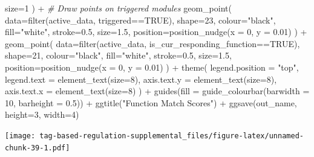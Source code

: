 \documentclass[
]{book}
\newenvironment{Shaded}{\begin{snugshade}}{\end{snugshade}}
\newcommand{\AttributeTok}[1]{\textcolor[rgb]{0.77,0.63,0.00}{#1}}
\newcommand{\CommentTok}[1]{\textcolor[rgb]{0.56,0.35,0.01}{\textit{#1}}}
\newcommand{\ConstantTok}[1]{\textcolor[rgb]{0.00,0.00,0.00}{#1}}
\newcommand{\DecValTok}[1]{\textcolor[rgb]{0.00,0.00,0.81}{#1}}
\newcommand{\FloatTok}[1]{\textcolor[rgb]{0.00,0.00,0.81}{#1}}
\newcommand{\FunctionTok}[1]{\textcolor[rgb]{0.00,0.00,0.00}{#1}}
\newcommand{\NormalTok}[1]{#1}
\newcommand{\SpecialCharTok}[1]{\textcolor[rgb]{0.00,0.00,0.00}{#1}}
\newcommand{\StringTok}[1]{\textcolor[rgb]{0.31,0.60,0.02}{#1}}
\begin{document}
\begin{Shaded}
\begin{Highlighting}[]
    \AttributeTok{size=}\DecValTok{1}
\NormalTok{  ) }\SpecialCharTok{+}
  \CommentTok{\# Draw points on triggered modules}
  \FunctionTok{geom\_point}\NormalTok{(}
    \AttributeTok{data=}\FunctionTok{filter}\NormalTok{(active\_data, triggered}\SpecialCharTok{==}\ConstantTok{TRUE}\NormalTok{),}
    \AttributeTok{shape=}\DecValTok{23}\NormalTok{,}
    \AttributeTok{colour=}\StringTok{"black"}\NormalTok{,}
    \AttributeTok{fill=}\StringTok{"white"}\NormalTok{,}
    \AttributeTok{stroke=}\FloatTok{0.5}\NormalTok{,}
    \AttributeTok{size=}\FloatTok{1.5}\NormalTok{,}
    \AttributeTok{position=}\FunctionTok{position\_nudge}\NormalTok{(}\AttributeTok{x =} \DecValTok{0}\NormalTok{, }\AttributeTok{y =} \FloatTok{0.01}\NormalTok{)}
\NormalTok{  ) }\SpecialCharTok{+}
  \FunctionTok{geom\_point}\NormalTok{(}
    \AttributeTok{data=}\FunctionTok{filter}\NormalTok{(active\_data, is\_cur\_responding\_function}\SpecialCharTok{==}\ConstantTok{TRUE}\NormalTok{),}
    \AttributeTok{shape=}\DecValTok{21}\NormalTok{,}
    \AttributeTok{colour=}\StringTok{"black"}\NormalTok{,}
    \AttributeTok{fill=}\StringTok{"white"}\NormalTok{,}
    \AttributeTok{stroke=}\FloatTok{0.5}\NormalTok{,}
    \AttributeTok{size=}\FloatTok{1.5}\NormalTok{,}
    \AttributeTok{position=}\FunctionTok{position\_nudge}\NormalTok{(}\AttributeTok{x =} \DecValTok{0}\NormalTok{, }\AttributeTok{y =} \FloatTok{0.01}\NormalTok{)}
\NormalTok{  ) }\SpecialCharTok{+}
  \FunctionTok{theme}\NormalTok{(}
    \AttributeTok{legend.position =} \StringTok{"top"}\NormalTok{,}
    \AttributeTok{legend.text =} \FunctionTok{element\_text}\NormalTok{(}\AttributeTok{size=}\DecValTok{8}\NormalTok{),}
    \AttributeTok{axis.text.y =} \FunctionTok{element\_text}\NormalTok{(}\AttributeTok{size=}\DecValTok{8}\NormalTok{),}
    \AttributeTok{axis.text.x =} \FunctionTok{element\_text}\NormalTok{(}\AttributeTok{size=}\DecValTok{8}\NormalTok{)}
\NormalTok{  ) }\SpecialCharTok{+}
  \FunctionTok{guides}\NormalTok{(}\AttributeTok{fill =} \FunctionTok{guide\_colourbar}\NormalTok{(}\AttributeTok{barwidth =} \DecValTok{10}\NormalTok{, }\AttributeTok{barheight =} \FloatTok{0.5}\NormalTok{)) }\SpecialCharTok{+}
  \FunctionTok{ggtitle}\NormalTok{(}\StringTok{"Function Match Scores"}\NormalTok{) }\SpecialCharTok{+}
  \FunctionTok{ggsave}\NormalTok{(out\_name, }\AttributeTok{height=}\DecValTok{3}\NormalTok{, }\AttributeTok{width=}\DecValTok{4}\NormalTok{)}
\end{Highlighting}
\end{Shaded}

\texttt{[image: tag-based-regulation-supplemental\_files/figure-latex/unnamed-chunk-39-1.pdf]}
\end{document}
